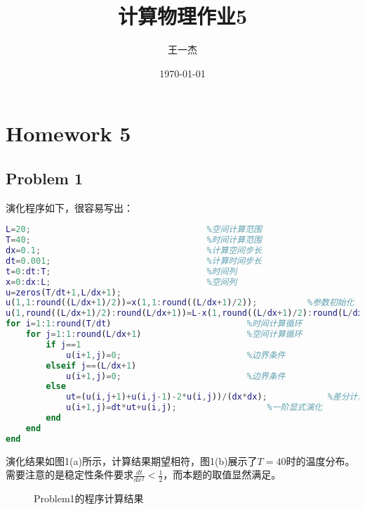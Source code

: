 \documentclass{article}
\title{计算物理作业5} %
\author[a]{王一杰} %
\affil[a]{中国科学技术大学}
\date{\today}%
\begin{document}
\maketitle

\section{Homework 5}
\subsection{Problem 1}

演化程序如下，很容易写出：
\begin{lstlisting}[language=MATLAB]
L=20;									%空间计算范围
T=40;									%时间计算范围
dx=0.1;									%计算空间步长
dt=0.001;								%计算时间步长
t=0:dt:T;								%时间列
x=0:dx:L;								%空间列
u=zeros(T/dt+1,L/dx+1);
u(1,1:round((L/dx+1)/2))=x(1,1:round((L/dx+1)/2));			%参数初始化
u(1,round((L/dx+1)/2):round(L/dx+1))=L-x(1,round((L/dx+1)/2):round(L/dx+1));
for i=1:1:round(T/dt)							%时间计算循环
    for j=1:1:round(L/dx+1)						%空间计算循环
        if j==1
            u(i+1,j)=0;							%边界条件
        elseif j==(L/dx+1)
            u(i+1,j)=0;							%边界条件
        else
            ut=(u(i,j+1)+u(i,j-1)-2*u(i,j))/(dx*dx);			%差分计算
            u(i+1,j)=dt*ut+u(i,j);					%一阶显式演化
        end
    end
end
\end{lstlisting}

演化结果如图1(a)所示，计算结果期望相符，图1(b)展示了$T=40$时的温度分布。需要注意的是稳定性条件要求$\frac{dt}{dx^2}<\frac{1}{2}$，而本题的取值显然满足。





\begin{figure}[tbp]
 \caption{Problem1的程序计算结果}
 \end{figure}
\end{document}
